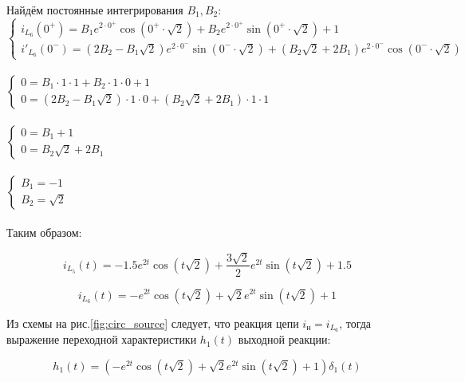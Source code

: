 Найдём постоянные интегрирования $ B_1, B_2 $:\\


$ \begin{cases}
    i_{L_6}(0^+) = 
    B_1 e^{2 \cdot 0^+} \cos(0^+ \cdot \sqrt{2}) + 
    B_2 e^{2 \cdot 0^+} \sin(0^+ \cdot \sqrt{2}) + 
    1\\
    i'_{L_6}(0^-) = 
    (2 B_2 - B_1 \sqrt{2}) e^{2 \cdot 0^-} \sin(0^- \cdot \sqrt{2}) +
    (B_2 \sqrt{2} + 2 B_1) e^{2 \cdot 0^-} \cos(0^- \cdot \sqrt{2})
\end{cases} $\\\\

$ \begin{cases}
    0 = B_1 \cdot 1 \cdot 1 + B_2 \cdot 1 \cdot 0 + 1\\
    0 = (2 B_2 - B_1 \sqrt{2}) \cdot 1 \cdot 0 + (B_2 \sqrt{2} + 2 B_1) \cdot 1 \cdot 1
\end{cases} $\\\\

$ \begin{cases}
    0 = B_1 + 1\\
    0 = B_2 \sqrt{2} + 2 B_1
\end{cases} $\\\\

$ \begin{cases}
    B_1 = -1\\
    B_2 = \sqrt{2}
\end{cases} $\\\\

Таким образом:

\begin{equation}\label{eq:i_L_5}
i_{L_5}(t) = 
- 1.5                e^{2t} \cos(t\sqrt{2}) + 
\dfrac{3\sqrt{2}}{2} e^{2t} \sin(t\sqrt{2}) +
1.5
\end{equation}

\begin{equation}\label{eq:i_L_6}
i_{L_6}(t) = 
-        e^{2t} \cos(t\sqrt{2}) + 
\sqrt{2} e^{2t} \sin(t\sqrt{2}) + 
1
\end{equation}

Из схемы на рис.\ref{fig:circ_source} следует, 
что реакция цепи $ i_н = i_{L_6} $,
тогда выражение переходной характеристики $ h_1(t) $
выходной реакции:

\begin{equation}\label{eq:h_1_t_1}
    h_1(t) = 
    (- e^{2t} \cos(t\sqrt{2}) + 
    \sqrt{2} e^{2t} \sin(t\sqrt{2}) + 1)\delta_1(t)
\end{equation}

